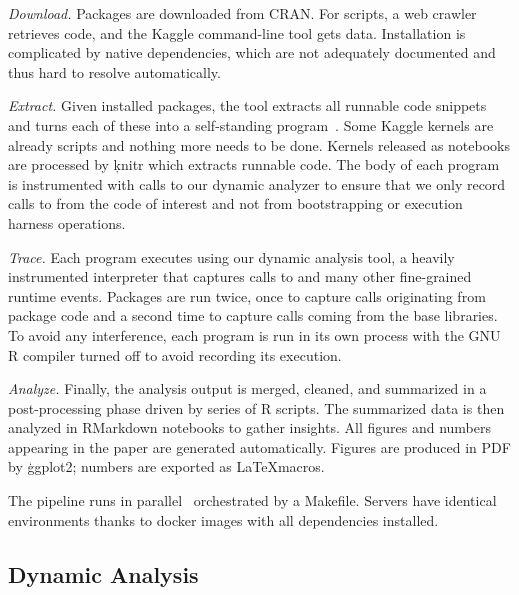\documentclass[review,screen,acmsmall]{acmart}
\begin{document}
\medskip
\begin{compactenum}
\item \emph{Download.} Packages are downloaded from CRAN. For scripts, a web
  crawler retrieves code, and the Kaggle command-line tool gets data.
  Installation is complicated by native dependencies, which are not adequately
  documented and thus hard to resolve automatically.
\item \emph{Extract.} Given installed packages, the \genthat tool extracts all
  runnable code snippets and turns each of these into a self-standing
  program~\cite{issta18}. Some Kaggle kernels are already scripts and nothing
  more needs to be done. Kernels released as notebooks are processed by
  \c{knitr} which extracts runnable code. The body of each program is
  instrumented with calls to our dynamic analyzer to ensure that we only record
  calls to \eval from the code of interest and not from bootstrapping or
  execution harness operations.
\item \emph{Trace.} Each program executes using our dynamic analysis tool, a
  heavily instrumented interpreter that captures calls to \eval and many other
  fine-grained runtime events. Packages are run twice, once to capture \eval
  calls originating from package code and a second time to capture calls coming
  from the base libraries. To avoid any interference, each program is run in its
  own process with the GNU R compiler turned off to avoid recording its
  execution.
\item \emph{Analyze.} Finally, the analysis output is merged, cleaned, and summarized
  in a post-processing phase driven by series of R scripts. The summarized data
  is then analyzed in RMarkdown notebooks to gather insights. All figures and
  numbers appearing in the paper are generated automatically. Figures are
  produced in PDF by \c{ggplot2}; numbers are exported as \LaTeX macros.
\end{compactenum}

\noindent The pipeline runs in parallel~\cite{GNUparallel} orchestrated
by a Makefile. Servers have identical environments thanks to docker images with
all dependencies installed.

\subsection{Dynamic Analysis}
\end{document}

